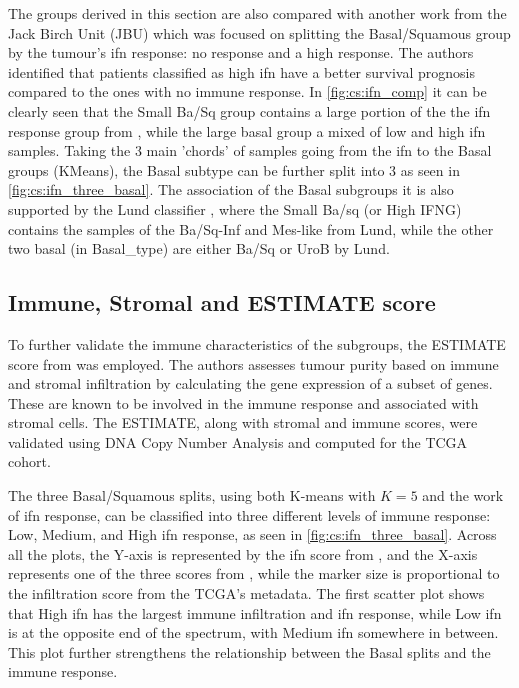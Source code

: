 The groups derived in this section are also compared with another work \citet{Baker2022-bj} from the Jack Birch Unit (JBU) which was focused on splitting the Basal/Squamous group by the tumour's \acrfull{ifn} response: no response and a high response. The authors identified that patients classified as high \acrshort{ifn} have a better survival prognosis compared to the ones with no immune response. In \cref{fig:cs:ifn_comp} it can be clearly seen that the Small Ba/Sq group contains a large portion of the the \acrshort{ifn} response group from \citet{Baker2022-bj}, while the large basal group a mixed of low and high \acrshort{ifn} samples. Taking the 3 main 'chords' of samples going from the \acrshort{ifn} to the Basal groups (KMeans), the Basal subtype can be further split into 3 as seen in \cref{fig:cs:ifn_three_basal}. The association of the Basal subgroups it is also supported by the Lund classifier \citet{Marzouka2018-ge}, where the Small Ba/sq (or High IFNG) contains the samples of the Ba/Sq-Inf and Mes-like from Lund, while the other two basal (in Basal\_type) are either Ba/Sq or UroB by Lund.

\subsection{Immune, Stromal and ESTIMATE score}

To further validate the immune characteristics of the subgroups, the ESTIMATE score from \citet{Yoshihara2013-wq} was employed. The authors assesses tumour purity based on immune and stromal infiltration by calculating the gene expression of a subset of genes. These are known to be involved in the immune response and associated with stromal cells. The ESTIMATE, along with stromal and immune scores, were validated using DNA Copy Number Analysis and computed for the TCGA cohort.

The three Basal/Squamous splits, using both K-means with \( K = 5 \) and the work of \acrshort{ifn} response, can be classified into three different levels of immune response: Low, Medium, and High \acrshort{ifn} response, as seen in \cref{fig:cs:ifn_three_basal}. Across all the plots, the Y-axis is represented by the \acrshort{ifn} score from \citet{Baker2022-bj}, and the X-axis represents one of the three scores from \citet{Yoshihara2013-wq}, while the marker size is proportional to the infiltration score from the TCGA's metadata. The first scatter plot shows that High \acrshort{ifn} has the largest immune infiltration and \acrshort{ifn} response, while Low \acrshort{ifn} is at the opposite end of the spectrum, with Medium \acrshort{ifn} somewhere in between. This plot further strengthens the relationship between the Basal splits and the immune response.

